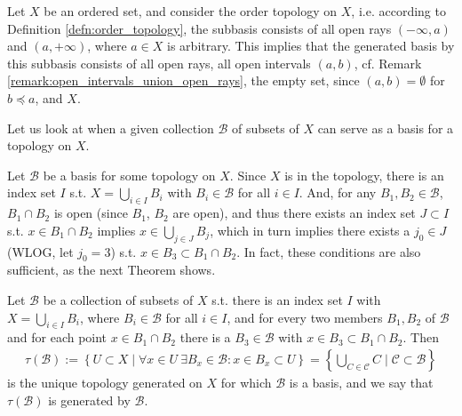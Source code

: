 \begin{exmp}
	Let $X$ be an ordered set, and consider the order topology on $X$, i.e. according to Definition \ref{defn:order_topology}, the subbasis consists of all open rays $(-\infty, a)$ and $(a, +\infty)$, where $a\in X$ is arbitrary. This implies that the generated basis by this subbasis consists of all open rays, all open intervals $(a, b)$, cf. Remark \ref{remark:open_intervals_union_open_rays}, the empty set, since $(a, b) = \emptyset$ for $b\preceq a$, and $X$.
\end{exmp}

Let us look at when a given collection $\mathscr B$ of subsets of $X$ can serve as a basis for a topology on $X$.

\begin{remark}
	Let $\mathscr B$ be a basis for some topology on $X$. Since $X$ is in the topology, there is an index set $I$ s.t. $X = \bigcup_{i\in I}B_i$ with $B_i\in\mathscr B$ for all $i\in I$. And, for any $B_1, B_2\in\mathscr B$, $B_1\cap B_2$ is open (since $B_1$, $B_2$ are open), and thus there exists an index set $J\subset I$ s.t. $x\in B_1\cap B_2$ implies $x\in \bigcup_{j\in J}B_j$, which in turn implies there exists a $j_0 \in J$ (WLOG, let $j_0 = 3$) s.t. $x\in B_3\subset B_1\cap B_2$. In fact, these conditions are also sufficient, as the next Theorem shows.
\end{remark}

\begin{theorem}\label{thrm:gen_top_by_coll_subsets}
	Let $\mathscr B$ be a collection of subsets of $X$ s.t. there is an index set $I$ with $X = \bigcup_{i\in I}B_i$, where $B_i\in\mathscr B$ for all $i\in I$, and for every two members $B_1, B_2$ of $\mathscr B$ and for each point $x\in B_1\cap B_2$ there is a $B_3\in\mathscr B$ with $x\in B_3\subset B_1\cap B_2$. Then 
	\begin{align}\label{eq:gen_top_by_coll_subsets}
		\tau(\mathscr B) := \left\{ U\subset X \mid \forall x\in U\ \exists B_x\in\mathscr B: x\in B_x\subset U\right\} = \left\{ \bigcup_{C\in\mathscr C} C \mid \mathscr C \subset \mathscr B \right\}
	\end{align} is the unique topology generated on $X$ for which $\mathscr B$ is a basis, and we say that $\tau(\mathscr B)$ is generated by $\mathscr B$.
\end{theorem}	


